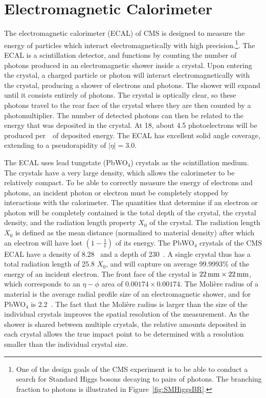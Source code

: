 \section{Electromagnetic Calorimeter}
The electromagnetic calorimeter (ECAL) of CMS is designed to measure the energy
of particles which interact electromagnetically with high
precision.\footnote{One of the design goals of the CMS experiment is to be able
to conduct a search for Standard Higgs bosons decaying to pairs of photons. The
branching fraction to photons is illustrated in Figure~\ref{fig:SMHiggsBR}.}.
The ECAL is a scintillation detector, and functions by counting the
number of photons produced in an electromagnetic shower inside a crystal.  Upon
entering the crystal, a charged particle or photon will interact
electromagnetically with the crystal, producing a shower of electrons and
photons. The shower will expand until it consists entirely of photons.  The
crystal is optically clear, so these photons travel to the rear face of the
crystal where they are then counted by a photomultiplier.  The number of
detected photons can then be related to the energy that was deposited in the
crystal.  At 18\celsius, about 4.5 photoelectrons will be produced
per~\mega\electronvolt~of deposited energy.  The ECAL has excellent solid angle
coverage, extending to a pseudorapidity of $|\eta| = 3.0$.

The ECAL uses lead tungstate (PbWO$_4$) crystals as the scintillation medium.
The crystals have a very large density, which allows the calorimeter to be
relatively compact.  To be able to correctly measure the energy of electrons and
photons, an incident photon or electron must be completely stopped by
interactions with the calorimeter.  The quantities that determine if an electron
or photon will be completely contained is the total depth of the crystal, the
crystal density, and the radiation length property $X_0$ of the crystal.  The
radiation length $X_0$ is defined as the mean distance (normalized to material
density) after which an electron will have lost $(1-\frac{1}{e})$ of its energy.
The PbWO$_4$ crystals of the CMS ECAL have a density of
8.28~\gram\per\square{\centi\meter} and a depth of 230~\mm.  A single crystal
thus has a total radiation length of 25.8 $X_0$, and will capture on average
99.9993\% of the energy of an incident electron.  The front face of the crystal
is $22\,\text{mm} \times 22\,\text{mm}$, which corresponds to an $\eta-\phi$ area of $0.00174
\times 0.00174$.  The Moli\`{e}re radius of a material is the average radial
profile size of an electromagnetic shower, and for PbWO$_4$ is 2.2~\centi\meter.
The fact that the Moli\`{e}re radius is larger than the size of the individual
crystals improves the spatial resolution of the measurement.  As the shower is
shared between multiple crystals, the relative amounts deposited in each crystal
allows the true impact point to be determined with a resolution smaller than the
individual crystal size.

